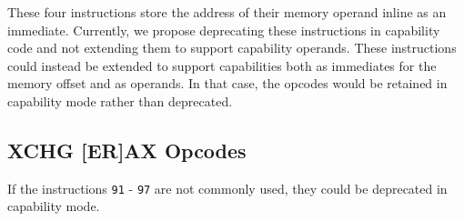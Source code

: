 These four  instructions store the address of their
memory operand inline as an immediate.  Currently, we propose
deprecating these instructions in capability code and not extending
them to support capability operands.  These instructions could instead
be extended to support capabilities both as immediates for the memory
offset and as operands.  In that case, the opcodes would be retained
in capability mode rather than deprecated.

\subsection{XCHG [ER]AX Opcodes}

If the  instructions \texttt{91} - \texttt{97} are not
commonly used, they could be deprecated in capability mode.
